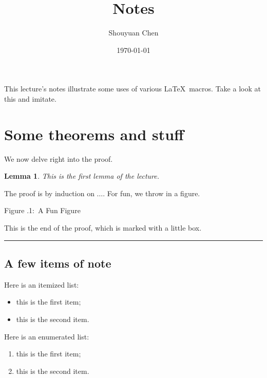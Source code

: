 \documentclass[twoside]{article}
\newcounter{lecnum}
\newcommand{\lecture}[4]{
   \pagestyle{myheadings}
   \thispagestyle{plain}
   \newpage
   \setcounter{lecnum}{#1}
   \setcounter{page}{1}
   \noindent
   \begin{center}
   \framebox{
      \vbox{\vspace{2mm}
    \hbox to 6.28in { {\bf 10-704: Information Processing and Learning
		\hfill Spring 2012} }
       \vspace{4mm}
       \hbox to 6.28in { {\Large \hfill Lecture #1: #2  \hfill} }
       \vspace{2mm}
       \hbox to 6.28in { {\it Lecturer: #3 \hfill Scribes: #4} }
      \vspace{2mm}}
   }
   \end{center}
   \markboth{Lecture #1: #2}{Lecture #1: #2}

   {\bf Note}: {\it LaTeX template courtesy of UC Berkeley EECS dept.}

   {\bf Disclaimer}: {\it These notes have not been subjected to the
   usual scrutiny reserved for formal publications.  They may be distributed
   outside this class only with the permission of the Instructor.}
   \vspace*{4mm}
}
\newcommand{\fig}[3]{
			\vspace{#2}
			\begin{center}
			Figure \thelecnum.#1:~#3
			\end{center}
	}
\newtheorem{lemma}[theorem]{Lemma}
\newenvironment{proof}{{\bf Proof:}}{\hfill\rule{2mm}{2mm}}
\begin{document}

\title{Notes}
\author{Shouyuan Chen}
\date{\today}
\maketitle


This lecture's notes illustrate some uses of
various \LaTeX\ macros.  
Take a look at this and imitate.

\section{Some theorems and stuff} %

We now delve right into the proof.

\begin{lemma}
This is the first lemma of the lecture.
\end{lemma}

\begin{proof}
The proof is by induction on $\ldots$.
For fun, we throw in a figure.
\fig{1}{1in}{A Fun Figure}

This is the end of the proof, which is marked with a little box.
\end{proof}

\subsection{A few items of note}

Here is an itemized list:
\begin{itemize}
\item this is the first item;
\item this is the second item.
\end{itemize}

Here is an enumerated list:
\begin{enumerate}
\item this is the first item;
\item this is the second item.
\end{enumerate}
\end{document}
